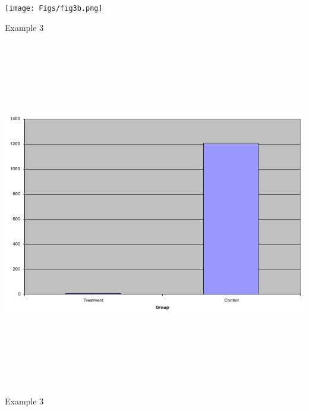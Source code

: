 \documentclass[12pt]{article}
\newcommand{\headsize}{\fontsize{35}{35} \selectfont}
\begin{document}
\vspace{30mm}

\centerline{\texttt{[image: Figs/fig3b.png]}}



\newpage


\headsize \color{yellow}
\hfill \begin{minipage}{5.75in}
\centering
Example 3
\end{minipage}

\vspace{30mm}

\centerline{\includegraphics[height=6in]{Figs/fig3c.png}}


\newpage


\headsize \color{yellow}
\hfill \begin{minipage}{5.75in}
\centering
Example 3
\end{minipage}

\vspace{30mm}
\end{document}
